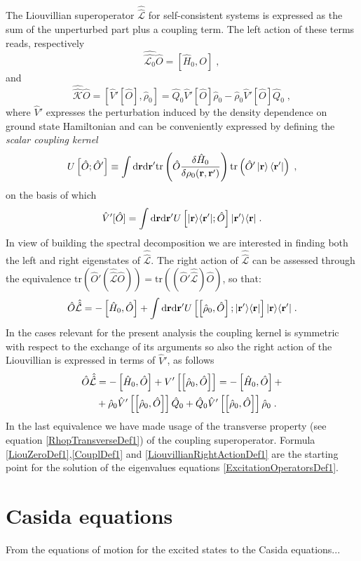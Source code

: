 \documentclass[reprint,aps,prb]{revtex4-1}
\newcommand{\dd}{{\rm d}}
\renewcommand{\r}{{\bf r}}
\newcommand{\be}{\begin{equation}}
\newcommand{\ee}{\end{equation}}
\newcommand{\nn}{\notag}
\newcommand{\lb}{\label}
\newcommand{\op}[1]{\hat {#1}}
\newcommand{\sop}[1]{\op{\op {#1}}}
\newcommand{\commutator}[2]{\left[ {#1} , {#2} \right]}
\newcommand{\trace}[1]{\mathrm{tr}\left(#1\right)}
\newcommand{\ketbra}[2]{| #1 \rangle \langle #2 |}
\newcommand{\dmnot}{\op{\rho}_0}
\newcommand{\hnot}{\op{H}_0}
\newcommand{\Liouv}{\sop{\mathcal L}}
\newcommand{\Liouvnot}{\sop{\mathcal L_0}}
\newcommand{\coupl}{\sop{\mathcal K}}
\begin{document}
The Liouvillian superoperator $\Liouv$ for self-consistent systems is expressed as the sum of the unperturbed part plus a coupling term. The left action of these 
terms reads, respectively
\be\lb{LiouZeroDef1}
\Liouvnot \op O = \commutator{\hnot}{O} \;,
\ee
and
\be\lb{CouplDef1}
\coupl\op O = \commutator{\op V'[\op O]}{\dmnot}  = \op Q_0\op V'[\op O]\dmnot - \dmnot\op V'[\op O]\op Q_0 \;,
\ee
where $\op V'$ expresses the perturbation induced by the density dependence on ground state Hamiltonian and can be conveniently expressed by defining the 
\emph{scalar coupling kernel}
\be
U\left[\op O; \op O'\right] \equiv  \int \dd \r \dd \r' \trace{\op O \frac{\delta \hnot }{\delta \rho_0(\r,\r')}
} \trace{\op O' \ket{\r} \bra{\r'}} \;, \nn
\ee
on the basis of which
\be\lb{VpDef1}
\op V'[\op O]= 
\int \dd \r \dd \r' U\left[\ketbra{\r}{\r'};\op O\right] \ketbra{\r'}{\r}\;.
\ee
In view of building the spectral decomposition we are interested in finding both the left and right eigenstates of $\Liouv$.   
The right action of $\Liouv$ can be assessed through the equivalence $\trace{\op O'(\Liouv\op O)} = \trace{(\op O'\Liouv)\op O}$, so that:
\be
\op O\Liouv = -\commutator{\hnot}{\op O} + \int \dd\r\dd\r'
U\left[\commutator{\dmnot}{\op O};\ketbra{\r'}{\r}\right]\ketbra{\r}{\r'} \;. \nn
\ee
In the cases relevant for the present analysis the coupling kernel is symmetric with respect to the exchange of its arguments so also the right action of the 
Liouvillian is expressed in terms of $\op V'$, as follows
\begin{align}\lb{LiouvillianRightActionDef1}
\op O\Liouv &= -\commutator{\hnot}{\op O} + V'\left[\commutator{{\dmnot}}{\op O}\right] = -\commutator{\hnot}{\op O} + \nn \\ 
&+ \dmnot\op V'\left[\commutator{{\dmnot}}{\op O}\right]\op Q_0 + \op Q_0\op V'\left[\commutator{\dmnot}{\op O}\right]\dmnot \;.
\end{align}
In the last equivalence we have made usage of the transverse property (see equation \eqref{RhopTransverseDef1}) of the coupling superoperator. Formula 
\eqref{LiouZeroDef1},\eqref{CouplDef1} and \eqref{LiouvillianRightActionDef1} are the starting point for the solution of the eigenvalues equations \eqref{ExcitationOperatorsDef1}. 

\section{Casida equations}

From the equations of motion for the excited states to the Casida equations...


%

\end{document}
